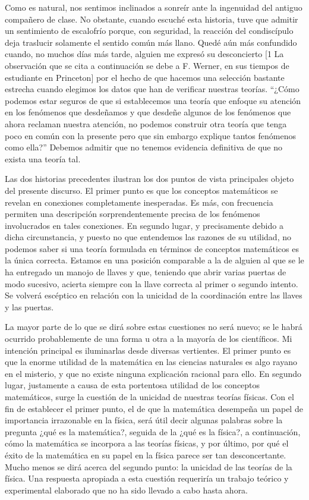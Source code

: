 \documentclass[a4paper, 12pt]{article}
\begin{document}
Como es natural, nos sentimos inclinados a sonreír ante la ingenuidad del antiguo compañero de clase. No obstante, cuando escuché esta historia, tuve que admitir un sentimiento de escalofrío porque, con seguridad, la reacción del condiscípulo deja traslucir solamente el sentido común más llano. Quedé aún más confundido cuando, no muchos días más tarde, alguien me expresó su desconcierto [1 La observación que se cita a continuación se debe a F. Werner, en sus tiempos de estudiante en Princeton] por el hecho de que hacemos una selección bastante estrecha cuando elegimos los datos que han de verificar nuestras teorías. ``¿Cómo podemos estar seguros de que si establecemos una teoría que enfoque su atención en los fenómenos que desdeñamos y que desdeñe algunos de los fenómenos que ahora reclaman nuestra atención, no podemos construir otra teoría que tenga poco en común con la presente pero que sin embargo explique tantos fenómenos como ella?'' Debemos admitir que no tenemos evidencia definitiva de que no exista una teoría tal.

Las dos historias precedentes ilustran los dos puntos de vista principales objeto del presente discurso. El primer punto es que los conceptos matemáticos se revelan en conexiones completamente inesperadas. Es más, con frecuencia permiten una descripción sorprendentemente precisa de los fenómenos involucrados en tales conexiones. En segundo lugar, y precisamente debido a dicha circunstancia, y puesto no que entendemos las razones de su utilidad, no podemos saber si una teoría formulada en términos de conceptos matemáticos es la única correcta. Estamos en una posición comparable a la de alguien al que se le ha entregado un manojo de llaves y que, teniendo que abrir varias puertas de modo sucesivo, acierta siempre con la llave correcta al primer o segundo intento. Se volverá escéptico en relación con la unicidad de la coordinación entre las llaves y las puertas.



La mayor parte de lo que se dirá sobre estas cuestiones no será nuevo; se le habrá ocurrido probablemente de una forma u otra a la mayoría de los científicos. Mi intención principal es iluminarlas desde diversas vertientes. El primer punto es que la enorme utilidad de la matemática en las ciencias naturales es algo rayano en el misterio, y que no existe ninguna explicación racional para ello. En segundo lugar, justamente a causa de esta portentosa utilidad de los conceptos matemáticos, surge la cuestión de la unicidad de nuestras teorías físicas. Con el fin de establecer el primer punto, el de que la matemática desempeña un papel de importancia irrazonable en la física, será útil decir algunas palabras sobre la pregunta ¿qué es la matemática?, seguida de la ¿qué es la física?, a continuación, cómo la matemática se incorpora a las teorías físicas, y por último, por qué el éxito de la matemática en su papel en la física parece ser tan desconcertante. Mucho menos se dirá acerca del segundo punto: la unicidad de las teorías de la física. Una respuesta apropiada a esta cuestión requeriría un trabajo teórico y experimental elaborado que no ha sido llevado a cabo hasta ahora.
\end{document}
